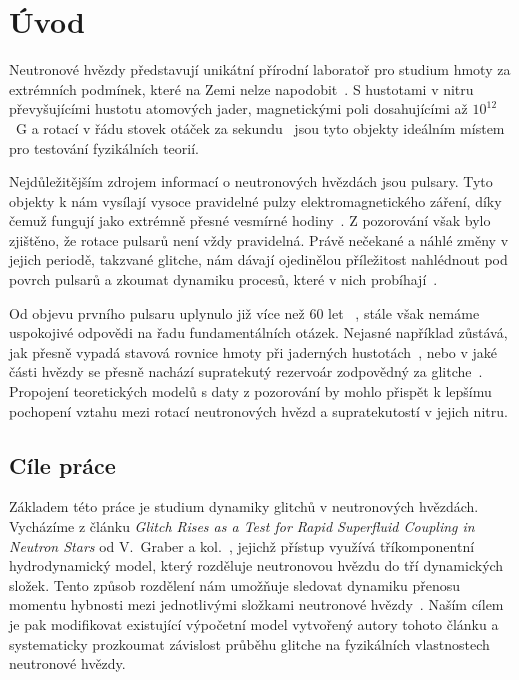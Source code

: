 \documentclass[%
final%
,htext%
]{ipothes}
\begin{document}
%


\noindent\chapter*{Úvod}
Neutronové hvězdy představují unikátní přírodní laboratoř pro studium hmoty za extrémních podmínek, které na Zemi nelze napodobit~\cite{vidana2020}. S hustotami v nitru převyšujícími hustotu atomových jader, magnetickými poli dosahujícími až $10^{12}$~G a rotací v řádu stovek otáček za sekundu~\cite{ghosh2007} jsou tyto objekty ideálním místem pro testování fyzikálních teorií.

Nejdůležitějším zdrojem informací o neutronových hvězdách jsou pulsary. Tyto objekty k nám vysílají vysoce pravidelné pulzy elektromagnetického záření, díky čemuž fungují jako extrémně přesné vesmírné hodiny~\cite{ghosh2007}. Z pozorování však bylo zjištěno, že rotace pulsarů není vždy pravidelná. Právě nečekané a náhlé změny v jejich periodě, takzvané glitche, nám dávají ojedinělou příležitost nahlédnout pod povrch pulsarů a zkoumat dynamiku procesů, které v nich probíhají~\cite{haskell2014}.

Od objevu prvního pulsaru uplynulo již více než 60 let ~\cite{ghosh2007}, stále však nemáme uspokojivé odpovědi na řadu fundamentálních otázek. Nejasné například zůstává, jak přesně vypadá stavová rovnice hmoty při jaderných hustotách~\cite{baym2018}, nebo v jaké části hvězdy se přesně nachází supratekutý rezervoár zodpovědný za glitche~\cite{andersson2021}. Propojení teoretických modelů s daty z pozorování by mohlo přispět k lepšímu pochopení vztahu mezi rotací neutronových hvězd a supratekutostí v jejich nitru.


\section*{Cíle práce}
Základem této práce je studium dynamiky glitchů v neutronových hvězdách. Vycházíme z článku \textit{Glitch Rises as a Test for Rapid Superfluid Coupling in Neutron Stars} od V.~Graber a kol.~\cite{graber2018}, jejichž přístup využívá tříkomponentní hydrodynamický model, který rozděluje neutronovou hvězdu do tří dynamických složek. Tento způsob rozdělení nám umožňuje sledovat dynamiku přenosu momentu hybnosti mezi jednotlivými složkami neutronové hvězdy~\cite{graber2018}.
Naším cílem je pak modifikovat existující výpočetní model vytvořený autory tohoto článku a systematicky prozkoumat závislost průběhu glitche na fyzikálních vlastnostech neutronové hvězdy. 
\end{document}
